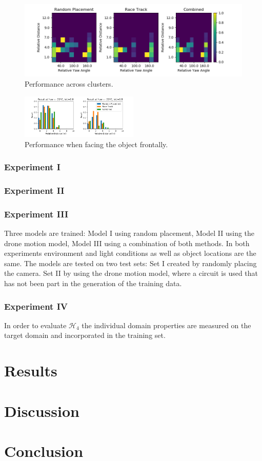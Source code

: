 \begin{figure}
	\includegraphics[width=\textwidth]{fig/recall_yaw}
	\caption{Performance across clusters.}
	\label{fig:recall_yaw}
\end{figure}
\begin{figure}
	\centering
	\includegraphics[width=0.5\textwidth]{fig/recall_front}
	\caption{Performance when facing the object frontally.}
	\label{fig:recall_front}
\end{figure}


\subsubsection{Experiment I}


\subsubsection{Experiment II}



\subsubsection{Experiment III}

Three models are trained: Model I using random placement, Model II using the drone motion model, Model III using a combination of both methods. In both experiments environment and light conditions as well as object locations are the same. The models are tested on two test sets: Set I created by randomly placing the camera. Set II by using the drone motion model, where a circuit is used that has not been part in the generation of the training data.


\subsubsection{Experiment IV}

In order to evaluate $\mathcal{H}_4$ the individual domain properties are measured on the target domain and incorporated in the training set.


\section{Results}
\label{sec:training:results}

\section{Discussion}
\label{sec:training:discussion}

\section{Conclusion}
\label{sec:training:conclusion}
